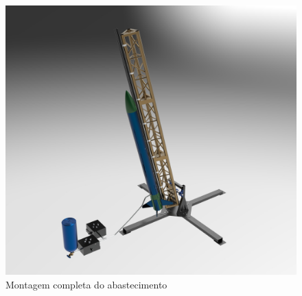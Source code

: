 \begin{figure} [H]
    \centering
    \includegraphics[width=1\textwidth]{Figuras/rend_alimentacao.31.jpg}
    \caption{Montagem completa do abastecimento}
\end{figure}
